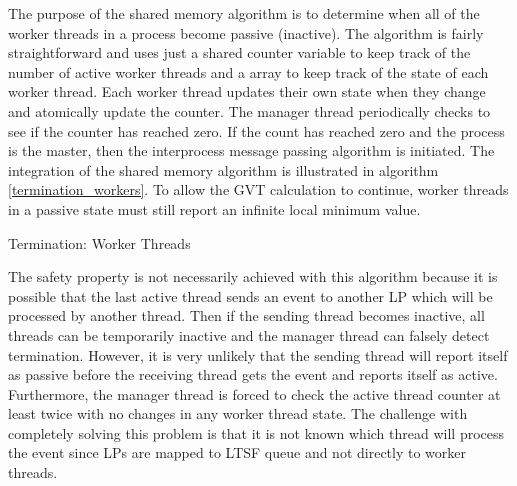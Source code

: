 \documentclass[11pt]{book}
\begin{document}
The purpose of the shared memory algorithm is to determine when all of the worker threads in a
process become passive (inactive).  The algorithm is fairly straightforward and uses just a shared
counter variable to keep track of the number of active worker threads and a array to keep track of
the state of each worker thread.  Each worker thread updates their own state when they change and
atomically update the counter.  The manager thread periodically checks to see if the counter has
reached zero.  If the count has reached zero and the process is the master, then the interprocess
message passing algorithm is initiated.  The integration of the shared memory algorithm is
illustrated in algorithm \ref{termination_workers}.  To allow the GVT calculation to continue,
worker threads in a passive state must still report an infinite local minimum value.

\begin{algorithm}
\DontPrintSemicolon
{}

    \caption{Termination: Worker Threads}\label{termination_workers}
\end{algorithm}

The safety property is not necessarily achieved with this algorithm because it is possible that the
last active thread sends an event to another LP which will be processed by another thread.  Then if
the sending thread becomes inactive, all threads can be temporarily inactive and the manager thread
can falsely detect termination.  However, it is very unlikely that the sending thread will report
itself as passive before the receiving thread gets the event and reports itself as active.
Furthermore, the manager thread is forced to check the active thread counter at least twice with no
changes in any worker thread state.  The challenge with completely solving this problem is that it
is not known which thread will process the event since LPs are mapped to LTSF queue and not directly
to worker threads.
\end{document}
